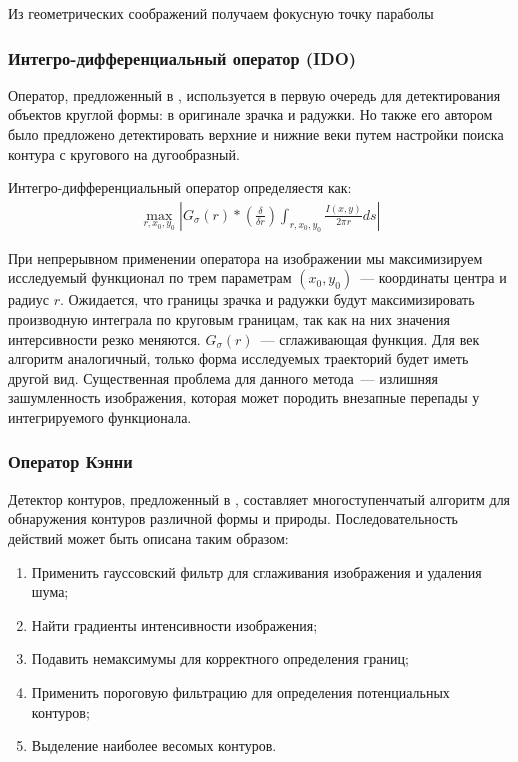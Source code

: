 \documentclass[12pt]{article} %
\begin{document}
Из геометрических соображений получаем фокусную точку параболы
\subsubsection{Интегро-дифференциальный оператор (IDO)}

Оператор, предложенный в \cite{Daugman2, Daugman4, Daugman, Daugman3}, используется в первую очередь для детектирования объектов круглой формы: в оригинале зрачка и радужки. Но также его автором было предложено детектировать верхние и нижние веки путем настройки поиска контура с кругового на дугообразный.

Интегро-дифференциальный оператор определяестя как:
\begin{gather}\label{norm}
	\max_{r, x_0, y_0}{\left| G_\sigma(r)*\left(\frac{\delta}{\delta r}\right)\int_{r, x_0, y_0}{\frac{I(x,y)}{2\pi r}ds}\right|}
\end{gather}

При непрерывном применении оператора на изображении мы максимизируем исследуемый функционал по трем параметрам $(x_0, y_0)$~--- координаты центра и радиус $r$. Ожидается, что границы зрачка и радужки будут максимизировать производную интеграла по круговым границам, так как на них значения интерсивности резко меняются. $G_\sigma(r)$~--- сглаживающая функция. Для век алгоритм аналогичный, только форма исследуемых траекторий будет иметь другой вид. Существенная проблема для данного метода~--- излишняя зашумленность изображения, которая может породить внезапные перепады у интегрируемого функционала.


\subsubsection{Оператор Кэнни}

Детектор контуров, предложенный в \cite{Canny}, составляет многоступенчатый алгоритм для обнаружения контуров различной формы и природы. Последовательность действий может быть описана таким образом:

\begin{enumerate}
	\item Применить гауссовский фильтр для сглаживания изображения и удаления шума;
	\item Найти градиенты интенсивности изображения;
	\item Подавить немаксимумы для корректного определения границ;
	\item Применить пороговую фильтрацию для определения потенциальных контуров;
	\item Выделение наиболее весомых контуров.
\end{enumerate}
\end{document}
